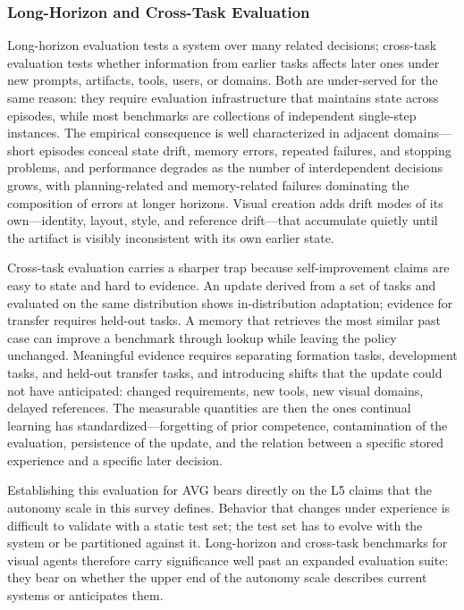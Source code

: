 \subsubsection{Long-Horizon and Cross-Task Evaluation}

Long-horizon evaluation tests a system over many related decisions; cross-task evaluation tests whether information from earlier tasks affects later ones under new prompts, artifacts, tools, users, or domains. Both are under-served for the same reason: they require evaluation infrastructure that maintains state across episodes, while most benchmarks are collections of independent single-step instances. The empirical consequence is well characterized in adjacent domains---short episodes conceal state drift, memory errors, repeated failures, and stopping problems, and performance degrades as the number of interdependent decisions grows, with planning-related and memory-related failures dominating the composition of errors at longer horizons. Visual creation adds drift modes of its own---identity, layout, style, and reference drift---that accumulate quietly until the artifact is visibly inconsistent with its own earlier state.

Cross-task evaluation carries a sharper trap because self-improvement claims are easy to state and hard to evidence. An update derived from a set of tasks and evaluated on the same distribution shows in-distribution adaptation; evidence for transfer requires held-out tasks. A memory that retrieves the most similar past case can improve a benchmark through lookup while leaving the policy unchanged. Meaningful evidence requires separating formation tasks, development tasks, and held-out transfer tasks, and introducing shifts that the update could not have anticipated: changed requirements, new tools, new visual domains, delayed references. The measurable quantities are then the ones continual learning has standardized---forgetting of prior competence, contamination of the evaluation, persistence of the update, and the relation between a specific stored experience and a specific later decision.

Establishing this evaluation for AVG bears directly on the L5 claims that the autonomy scale in this survey defines. Behavior that changes under experience is difficult to validate with a static test set; the test set has to evolve with the system or be partitioned against it. Long-horizon and cross-task benchmarks for visual agents therefore carry significance well past an expanded evaluation suite: they bear on whether the upper end of the autonomy scale describes current systems or anticipates them.

